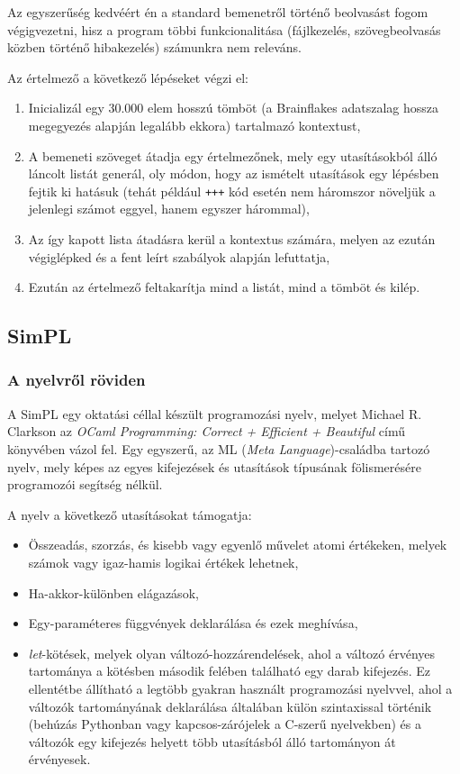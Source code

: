 Az egyszerűség kedvéért én a standard bemenetről történő beolvasást fogom végigvezetni, hisz a program többi funkcionalitása (fájlkezelés, szövegbeolvasás közben történő hibakezelés) számunkra nem releváns.

Az értelmező a következő lépéseket végzi el:

\begin{enumerate}
    \item Inicializál egy 30.000 elem hosszú tömböt (a Brainflakes adatszalag hossza megegyezés alapján legalább ekkora) tartalmazó kontextust,
    \item A bemeneti szöveget átadja egy értelmezőnek, mely egy utasításokból álló láncolt listát generál, oly módon, hogy az ismételt utasítások egy lépésben fejtik ki hatásuk (tehát például \texttt{+++} kód esetén nem háromszor növeljük a jelenlegi számot eggyel, hanem egyszer hárommal),
    \item Az így kapott lista átadásra kerül a kontextus számára, melyen az ezután végiglépked és a fent leírt szabályok alapján lefuttatja,
    \item Ezután az értelmező feltakarítja mind a listát, mind a tömböt és kilép.
\end{enumerate}

\subsection{SimPL}
\label{sec:simpl}

\subsubsection{A nyelvről röviden}

A SimPL egy oktatási céllal készült programozási nyelv, melyet Michael R. Clarkson az \textit{OCaml Programming: Correct + Efficient + Beautiful} című könyvében\cite{ocaml} vázol fel. Egy egyszerű, az ML (\textit{Meta Language})-családba tartozó nyelv, mely képes az egyes kifejezések és utasítások típusának fölismerésére programozói segítség nélkül.

A nyelv a következő utasításokat támogatja:

\begin{itemize}
    \item Összeadás, szorzás, és kisebb vagy egyenlő művelet atomi értékeken, melyek számok vagy igaz-hamis logikai értékek lehetnek,
    \item Ha-akkor-különben elágazások,
    \item Egy-paraméteres függvények deklarálása és ezek meghívása, 
    \item \textit{let}-kötések, melyek olyan változó-hozzárendelések, ahol a változó érvényes tartománya a kötésben második felében található egy darab kifejezés. Ez ellentétbe állítható a legtöbb gyakran használt programozási nyelvvel, ahol a változók tartományának deklarálása általában külön szintaxissal történik (behúzás Pythonban vagy kapcsos-zárójelek a C-szerű nyelvekben) és a változók egy kifejezés helyett több utasításból álló tartományon át érvényesek.
\end{itemize}

